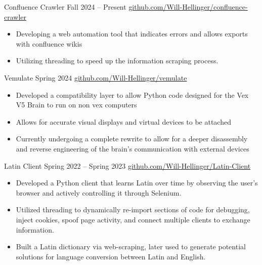 \documentclass[10pt,letterpaper]{altacv}
\begin{document}

\cvproject
        {Confluence Crawler}
        {
                {\normalfont Fall 2024 -- Present}
                {\normalfont\textbullet}
                \href{https://github.com/Will-Hellinger/confluence-crawler}{github.com/Will-Hellinger/confluence-crawler}
        }
        {
            \begin{itemize}
                \item Developing a web automation tool that indicates errors and allows exports with confluence wikis
                \item Utilizing threading to speed up the information scraping process.
            \end{itemize}
        }
        {}

\divider

\cvproject
        {Vemulate}
        {
                {\normalfont Spring 2024}
                {\normalfont\textbullet}
                \href{https://github.com/Will-Hellinger/vemulate}{github.com/Will-Hellinger/vemulate}
        }
        {
            \begin{itemize}
                \item Developed a compatibility layer to allow Python code designed for the Vex V5 Brain to run on non vex computers
                \item Allows for accurate visual displays and virtual devices to be attached
                \item Currently undergoing a complete rewrite to allow for a deeper disassembly and reverse engineering of the brain's communication with external devices
            \end{itemize}
        }
        {}

\divider

\cvproject
        {Latin Client}
        {
                {\normalfont Spring 2022 -- Spring 2023}
                {\normalfont\textbullet}
                \href{https://github.com/Will-Hellinger/Latin-Client}{github.com/Will-Hellinger/Latin-Client}
        }
        {
            \begin{itemize}
                \item Developed a Python client that learns Latin over time by observing the user's browser and actively controlling it through Selenium.
                \item Utilized threading to dynamically re-import sections of code for debugging, inject cookies, spoof page activity, and connect multiple clients to exchange information.
                \item Built a Latin dictionary via web-scraping, later used to generate potential solutions for language conversion between Latin and English.
            \end{itemize}
        }
        {}
\end{document}
